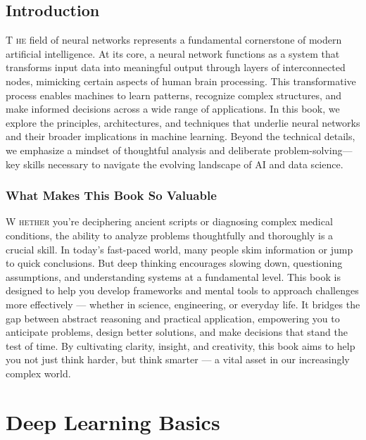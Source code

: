 \documentclass{book}
\begin{document}
\section{Introduction}
\lettrine{T}{ he} field of neural networks represents a fundamental cornerstone of modern artificial intelligence. At its core, a neural network functions as a system that transforms input data into meaningful output through layers of interconnected nodes, mimicking certain aspects of human brain processing. This transformative process enables machines to learn patterns, recognize complex structures, and make informed decisions across a wide range of applications.
In this book, we explore the principles, architectures, and techniques that underlie neural networks and their broader implications in machine learning. Beyond the technical details, we emphasize a mindset of thoughtful analysis and deliberate problem-solving—key skills necessary to navigate the evolving landscape of AI and data science.

\subsection{What Makes This Book So Valuable}
\lettrine{W}{ hether} you're deciphering ancient scripts or diagnosing complex medical conditions, the ability to analyze problems thoughtfully and thoroughly is a crucial skill. In today’s fast-paced world, many people skim information or jump to quick conclusions. But deep thinking encourages slowing down, questioning assumptions, and understanding systems at a fundamental level.
This book is designed to help you develop frameworks and mental tools to approach challenges more effectively — whether in science, engineering, or everyday life. It bridges the gap between abstract reasoning and practical application, empowering you to anticipate problems, design better solutions, and make decisions that stand the test of time.
By cultivating clarity, insight, and creativity, this book aims to help you not just think harder, but think smarter — a vital asset in our increasingly complex world.

\chapter{Deep Learning Basics}
\end{document}
